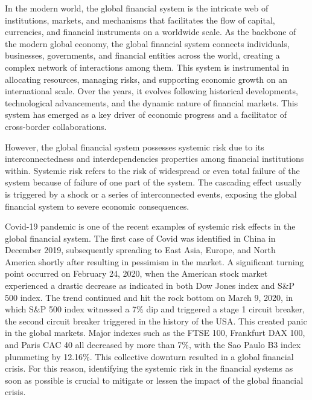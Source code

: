 \documentclass[a4paper,11pt]{article}
\begin{document}
In the modern world, the global financial system is the intricate web of institutions, markets, and mechanisms that facilitates the flow of capital, currencies, and financial instruments on a worldwide scale. As the backbone of the modern global economy, the global financial system connects individuals, businesses, governments, and financial entities across the world, creating a complex network of interactions among them. This system is instrumental in allocating resources, managing risks, and supporting economic growth on an international scale. Over the years, it evolves following historical developments, technological advancements, and the dynamic nature of financial markets. This system has emerged as a key driver of economic progress and a facilitator of cross-border collaborations.

However, the global financial system possesses systemic risk due to its interconnectedness and interdependencies properties among financial institutions within. Systemic risk refers to the risk of widespread or even total failure of the system because of failure of one part of the system. The cascading effect usually is triggered by a shock or a series of interconnected events, exposing the global financial system to severe economic consequences.

Covid-19 pandemic is one of the recent examples of systemic risk effects in the global financial system. The first case of Covid was identified in China in December 2019, subsequently spreading to East Asia, Europe, and North America shortly after resulting in pessimism in the market. A significant turning point occurred on February 24, 2020, when the American stock market experienced a drastic decrease as indicated in both Dow Jones index and S\&P 500 index. The trend continued and hit the rock bottom on March 9, 2020, in which S\&P 500 index witnessed a 7\% dip and triggered a stage 1 circuit breaker, the second circuit breaker triggered in the history of the USA. This created panic in the global markets. Major indexes such as the FTSE 100, Frankfurt DAX 100, and Paris CAC 40 all decreased by more than 7\%, with the Sao Paulo B3 index plummeting by 12.16\%. This collective downturn resulted in a global financial crisis. For this reason, identifying the systemic risk in the financial systems as soon as possible is crucial to mitigate or lessen the impact of the global financial crisis.
\end{document}
